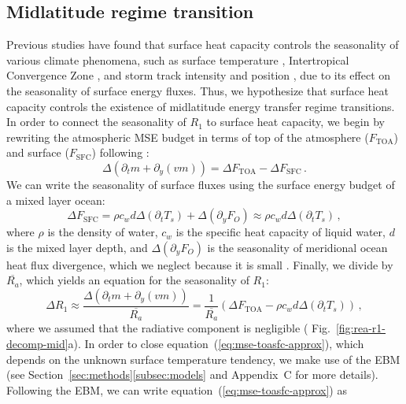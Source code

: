 \documentclass{ametsocV5}
\begin{document}
  \subsection{Midlatitude regime transition} \label{subsec:mld}
  Previous studies have found that surface heat capacity controls the seasonality of various climate phenomena, such as surface temperature \citep{donohoe2014}, Intertropical Convergence Zone \citep{bordoni2008}, and storm track intensity and position \citep{barpanda2020}, due to its effect on the seasonality of surface energy fluxes. Thus, we hypothesize that surface heat capacity controls the existence of midlatitude energy transfer regime transitions. In order to connect the seasonality of $R_1$ to surface heat capacity, we begin by rewriting the atmospheric MSE budget in terms of top of the atmosphere ($F_\mathrm{TOA}$) and surface ($F_\mathrm{SFC}$) following \cite{barpanda2020}:
  \begin{equation}\label{eq:mse-toasfc}
    \Delta\left(\partial_t m + \partial_y (vm) \right) = \Delta F_{\mathrm{TOA}} - \Delta F_{\mathrm{SFC}} \, .
  \end{equation}
  We can write the seasonality of surface fluxes using the surface energy budget of a mixed layer ocean:
  \begin{equation}
    \Delta F_{\mathrm{SFC}} = \rho c_{w} d \Delta\left(\partial_t T_{s}\right) + \Delta ( \partial_y F_{O}) \approx \rho c_{w} d \Delta\left(\partial_t T_{s}\right) \, ,
  \end{equation}
  where $\rho$ is the density of water, $c_w$ is the specific heat capacity of liquid water, $d$ is the mixed layer depth, and $\Delta(\partial_y F_O)$ is the seasonality of meridional ocean heat flux divergence, which we neglect because it is small \citep{roberts2017}. Finally, we divide by $\overline{R_a}$, which yields an equation for the seasonality of $R_1$:
  \begin{equation}\label{eq:mse-toasfc-approx}
    \Delta R_1 \approx \frac{\Delta\left(\partial_t m + \partial_y (vm) \right)}{\overline{R_a}} = \frac{1}{\overline{R_a}} \left(\Delta F_{\mathrm{TOA}} - \rho c_{w} d \Delta\left(\partial_t T_{s}\right)\right) \, , 
  \end{equation}
  where we assumed that the radiative component is negligible ( Fig.~\ref{fig:rea-r1-decomp-mid}a). In order to close equation~(\ref{eq:mse-toasfc-approx}), which depends on the unknown surface temperature tendency, we make use of the EBM (see Section~\ref{sec:methods}\ref{subsec:models} and Appendix~C for more details). Following the EBM, we can write equation~(\ref{eq:mse-toasfc-approx}) as
\end{document}
